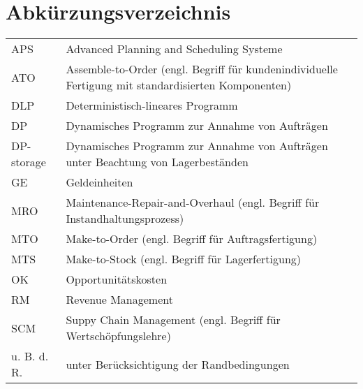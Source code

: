 \documentclass[a4paper,12pt,normalheadings,footexclude,headinclude,liststotoc,nochapterprefix,onecolumn,oneside,parskip,pointlessnumbers]{scrreprt}
\begin{document}
\chapter*{Abkürzungsverzeichnis}
\begin{table}[h!]
    \vspace*{-3mm}
    \hspace*{2mm}
  \renewcommand{\arraystretch}{1,5}
  \begin{flushleft}
    \begin{tabular}{lp{11.5cm}}  %
        APS & Advanced Planning and Scheduling Systeme \\
        ATO & Assemble-to-Order (engl. Begriff für kundenindividuelle Fertigung mit standardisierten Komponenten)\\
        DLP			& Deterministisch-lineares Programm\\
        DP  			 & Dynamisches Programm zur Annahme von Aufträgen\\
        DP-storage		    & Dynamisches Programm zur Annahme von Aufträgen unter Beachtung von Lagerbeständen\\
        GE & Geldeinheiten \\
        MRO & Maintenance-Repair-and-Overhaul (engl. Begriff für Instandhaltungsprozess)\\
     MTO & Make-to-Order (engl. Begriff für Auftragsfertigung) \\
     MTS & Make-to-Stock (engl. Begriff für Lagerfertigung)\\
     OK		    & Opportunitätskosten\\
     RM		    & Revenue Management\\
     SCM & Suppy Chain Management (engl. Begriff für Wertschöpfungslehre) \\
    u. B. d. R. & unter Berücksichtigung der Randbedingungen\\
	\end{tabular}
	\end{flushleft}
\end{table}

\end{document}
